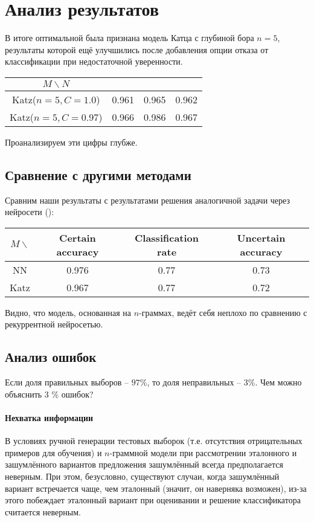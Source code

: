 
\section{ Анализ результатов }\label{sec:analysis}

В итоге оптимальной была признана модель Катца с глубиной бора $n=5$, результаты которой ещё улучшились после добавления опции отказа от классификации при недостаточной уверенности.

\begin{tabular}{|c|c|c|c|}\hline
	$M \backslash N$ & \KG & \BS & \MX \\ \hline
	Katz($n=5, C=1.0$)			 & 0.961 & 0.965 & 0.962 \\
	Katz($n=5, C=0.97$)	 & 0.966  & 0.986 & 0.967 \\ \hline 	
\end{tabular}

Проанализируем эти цифры глубже.

\subsection{ Сравнение с другими методами }

Сравним наши результаты с результатами решения аналогичной задачи через нейросети (): 

\begin{tabular}{|c|c|c|c|}\hline
	$M \backslash $ & Certain accuracy & Classification rate & Uncertain accuracy \\ \hline
	NN	 & 0.976  & 0.77  & 0.73 \\
	Katz	 & 0.967  & 0.77 & 0.72  \\ \hline 	
\end{tabular}

Видно, что модель, основанная на $n$-граммах, ведёт себя неплохо по сравнению с рекуррентной нейросетью.


\subsection{ Анализ ошибок }

Если доля правильных выборов -- $97 \%$, то доля неправильных -- $3 \%$. Чем можно объяснить 3 \% ошибок?

\paragraph{ Нехватка информации } В условиях ручной генерации тестовых выборок (т.е. отсутствия отрицательных примеров для обучения) и $n$-граммной модели при рассмотрении эталонного и зашумлённого вариантов предложения зашумлённый всегда предполагается неверным. При этом, безусловно, существуют случаи, когда зашумлённый вариант встречается чаще, чем эталонный (значит, он наверняка возможен), из-за этого побеждает эталонный вариант при оценивании и решение классификатора считается неверным.
	

